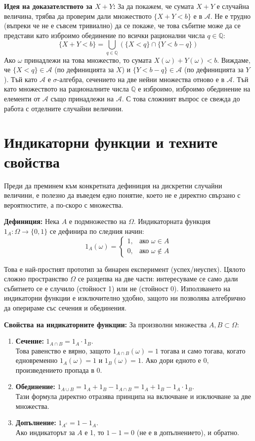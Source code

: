 \documentclass{article}
\begin{document}
\textbf{Идея на доказателството за $X + Y$:} 
За да покажем, че сумата $X+Y$ е случайна величина, трябва да проверим дали множеството $\{ X + Y < b \}$ е в $\mathcal{A}$. Не е трудно (въпреки че не е съвсем тривиално) да се покаже, че това събитие може да се представи като изброимо обединение по всички рационални числа $q \in \mathbb{Q}$:
\[ \{ X + Y < b \} = \bigcup_{q \in \mathbb{Q}} ( \{ X < q \} \cap \{ Y < b - q \} ) \]
Ако $\omega$ принадлежи на това множество, то сумата $X(\omega) + Y(\omega) < b$. Виждаме, че $\{ X < q \} \in \mathcal{A}$ (по дефиницията за $X$) и $\{ Y < b - q \} \in \mathcal{A}$ (по дефиницията за $Y$). Тъй като $\mathcal{A}$ е $\sigma$-алгебра, сечението на две нейни множества отново е в $\mathcal{A}$. Тъй като множеството на рационалните числа $\mathbb{Q}$ е изброимо, изброимо обединение на елементи от $\mathcal{A}$ също принадлежи на $\mathcal{A}$. С това сложният въпрос се свежда до работа с отделните случайни величини.

\section{Индикаторни функции и техните свойства}

Преди да преминем към конкретната дефиниция на дискретни случайни величини, е полезно да въведем едно понятие, което не е директно свързано с вероятностите, а по-скоро с множества.

\textbf{Дефиниция:} Нека $A$ е подмножество на $\Omega$. Индикаторната функция $1_A : \Omega \rightarrow \{0, 1\}$ се дефинира по следния начин:
\[
1_A(\omega) = 
\begin{cases} 
1, & \text{ако } \omega \in A \\ 
0, & \text{ако } \omega \notin A 
\end{cases}
\]

Това е най-простият прототип за бинарен експеримент (успех/неуспех). Цялото сложно пространство $\Omega$ се разцепва на две части: интересуваме се само дали събитието се е случило (стойност 1) или не (стойност 0). Използването на индикаторни функции е изключително удобно, защото ни позволява алгебрично да оперираме със сечения и обединения.

\textbf{Свойства на индикаторните функции:}
За произволни множества $A, B \subset \Omega$:
\begin{enumerate}
    \item \textbf{Сечение:} $1_{A \cap B} = 1_A \cdot 1_B$. \\
    Това равенство е вярно, защото $1_{A \cap B}(\omega) = 1$ тогава и само тогава, когато едновременно $1_A(\omega) = 1$ и $1_B(\omega) = 1$. Ако дори едното е 0, произведението пропада в 0.
    \item \textbf{Обединение:} $1_{A \cup B} = 1_A + 1_B - 1_{A \cap B} = 1_A + 1_B - 1_A \cdot 1_B$. \\
    Тази формула директно отразява принципа на включване и изключване за две множества.
    \item \textbf{Допълнение:} $1_{A^c} = 1 - 1_A$. \\
    Ако индикаторът за $A$ е 1, то $1 - 1 = 0$ (не е в допълнението), и обратно.
\end{enumerate}
\end{document}
